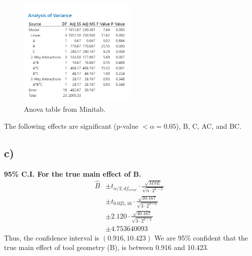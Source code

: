 \documentclass{article}
\begin{document}
\begin{figure}[h]
    \centering
    \includegraphics[width=0.5\textwidth]{./images/1_b.png}
    \caption{Anova table from Minitab.}
    \label{fig:3_b_2}
\end{figure}

The following effects are significant (p-value $< \alpha = 0.05$), B, C, AC, and BC.

\subsection*{c)}
\textbf{95\% C.I. For the true main effect of B.} \\
\begin{align*}
    \hat{B} &\pm t_{\alpha/2, df_{error}} \cdot \frac{\sqrt{MSE}}{\sqrt{n \cdot 2^{k-2}}} \\
            &\pm t_{0.025, 16} \cdot \frac{\sqrt{30.167}}{\sqrt{3 \cdot 2^{3-2}}} \\
            &\pm 2.120 \cdot \frac{\sqrt{30.167}}{\sqrt{3 \cdot 2^{3-2}}} \\
            &\pm 4.753640093
\end{align*}
Thus, the confidence interval is $(0.916, 10.423)$
We are 95\% confident that the true main effect of tool geometry (B), is between 0.916 and 10.423.
\end{document}

